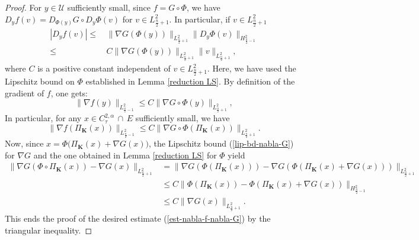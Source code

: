 \documentclass[a4paper,11pt,reqno]{amsart}
\numberwithin{equation}{section}
\begin{document}
	\begin{proof}
		For $y\in \mathcal{U}$ sufficiently small, since $f = G\circ \Phi$,  we have $D_yf(v)=D_{\Phi(y)}G\circ D_{y}\Phi(v)$ for $v\in L^{2}_{\frac{n}{2}+1}$. In particular, if $v\in L^{2}_{\frac{n}{2}+1}$
\begin{equation*}
\begin{split}
|D_yf(v)|\leq\,& \|\nabla G(\Phi(y))\|_{L^2_{\frac{n}{2}+1}}\|D_y\Phi(v)\|_{H^2_{\frac{n}{2}-1}}\\
\leq\,&C\|\nabla G(\Phi(y))\|_{L^2_{\frac{n}{2}+1}}\|v\|_{L^2_{\frac{n}{2}+1}},
\end{split}
\end{equation*}
where $C$ is a positive constant independent of $v\in L^{2}_{\frac{n}{2}+1}$. Here, we have used the Lipschitz bound on $\Phi$ established in Lemma \ref{reduction LS}. By definition of the gradient of $f$, one gets: 
		\begin{equation*}
		\|\nabla f(y)\|_{L^2_{\frac{n}{2}-1}}\leq C\|\nabla G\circ\Phi(y)\|_{L^2_{\frac{n}{2}+1}},
		\end{equation*}
	In particular, for any $x\in C^{2,\alpha}_{\tau}\,\cap\, E$ sufficiently small, we have
		\begin{equation}
		\|\nabla f(\Pi_\mathbf{K}(x))\|_{L^2_{\frac{n}{2}-1}}\leq C\|\nabla G\circ\Phi( \Pi_\mathbf{K}(x))\|_{L^2_{\frac{n}{2}+1}}.\label{lovely-inequ-nabla-f-G}
		\end{equation}
		Now, since $x = \Phi\big(\Pi_\mathbf{K}(x)+\nabla G(x)\big)$, the Lipschitz bound (\ref{lip-bd-nabla-G}) for $\nabla G$ and the one obtained in Lemma \ref{reduction LS} for $\Phi$ yield
		\begin{align*}
		\|\nabla G(\Phi\circ \Pi_\mathbf{K}(x)) - \nabla G(x)\|_{L^2_{\frac{n}{2}+1}} &= \|\nabla G(\Phi( \Pi_\mathbf{K}(x))) -\nabla G(\Phi(\Pi_\mathbf{K}(x)+\nabla G(x)))\|_{L^2_{\frac{n}{2}+1}}\\
		&\leq C \|\Phi( \Pi_\mathbf{K}(x))- \Phi(\Pi_\mathbf{K}(x)+\nabla G(x))\|_{H^2_{\frac{n}{2}-1}}\\
		&\leq C \|\nabla G(x)\|_{L^2_{\frac{n}{2}+1}}.
		\end{align*}
		This ends the proof of the desired estimate (\ref{est-nabla-f-nabla-G}) by the triangular inequality.
		

\end{proof}
\end{document}
